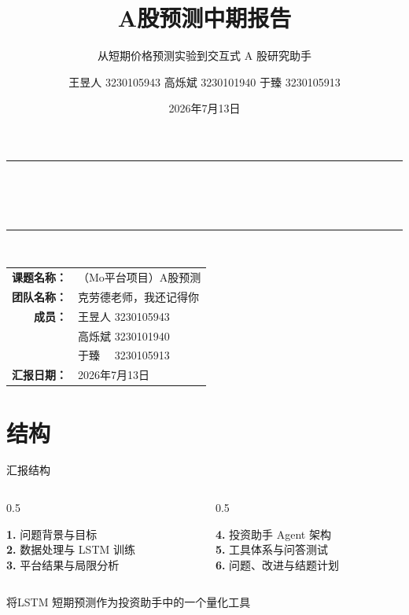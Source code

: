 \documentclass[10pt,aspectratio=43]{beamer}
\title[A股预测]{A股预测中期报告}
\subtitle{从短期价格预测实验到交互式 A 股研究助手}
\author{王昱人 3230105943 \quad 高烁斌 3230101940 \quad 于臻 3230105913}
\institute{团队名称：克劳德老师，我还记得你}
\date{2026年7月13日}
\begin{document}
\begin{frame}[plain]
  \vfill
  \begin{center}
    {\color{ZJUBlue}\rule{0.86\textwidth}{1.2pt}}\\[0.8em]
    {\kaifont\Large\bfseries\color{ZJUBlue}\inserttitle}\\[0.35em]
    {\large\color{AccentGray}\insertsubtitle}\\[0.65em]
    {\color{ZJUBlue}\rule{0.86\textwidth}{1.2pt}}\\[1.8em]
    \begin{tabular}{rl}
      \textbf{课题名称：} & （Mo平台项目）A股预测 \\
      \textbf{团队名称：} & 克劳德老师，我还记得你 \\
      \textbf{成员：} & 王昱人 3230105943\\
      & 高烁斌 3230101940\\
      & 于臻 \, \, 3230105913\\
      \textbf{汇报日期：} & 2026年7月13日
    \end{tabular}
  \end{center}
  \vfill
\end{frame}

\section{结构}

\begin{frame}{汇报结构}
  \vspace{0.3em}
  \begin{columns}[T]
    \begin{column}{0.5\textwidth}
      \begin{hlbox}[title=课程作业主线]
        \small
        \textbf{1.} 问题背景与目标\\[0.35em]
        \textbf{2.} 数据处理与 LSTM 训练\\[0.35em]
        \textbf{3.} 平台结果与局限分析
      \end{hlbox}
    \end{column}
    \begin{column}{0.5\textwidth}
      \begin{greenbox}[title=系统扩展主线]
        \small
        \textbf{4.} 投资助手 Agent 架构\\[0.35em]
        \textbf{5.} 工具体系与问答测试\\[0.35em]
        \textbf{6.} 问题、改进与结题计划
      \end{greenbox}
    \end{column}
  \end{columns}
  \vspace{0.9em}
  \begin{center}
    {\kaifont\large\color{ZJUBlue}将LSTM 短期预测作为投资助手中的一个量化工具}
  \end{center}
\end{frame}
\end{document}
